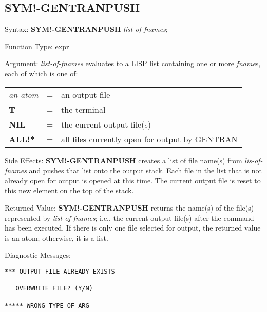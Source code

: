 \subsection{SYM!-GENTRANPUSH}
\begin{describe}{Syntax:}
{\bf SYM!-GENTRANPUSH} {\it  list-of-fnames\/};
\end{describe} 
\begin{describe}{Function Type:}
expr
\end{describe} 
\begin{describe}{Argument:}
{\it list-of-fnames\/} evaluates to a LISP list containing one or more 
{\it fname}s, each of which is one of:

\begin{tabular}{lll}
{\it an atom} & = &  an output file\\
{\bf T} & = & the terminal\\
{\bf NIL} & = & the current output file(s)\\
{\bf ALL!*} & = & all files currently open for output by GENTRAN\\
\end{tabular}
\end{describe} 
\begin{describe}{Side Effects:}
{\bf SYM!-GENTRANPUSH} creates a list of file name(s) from {\it lis-of-fnames\/}
and pushes that list onto the output stack.  Each file in the list that
is not already open for output is opened at this time.  The current
output file is reset to this new element on the top of the stack.
\end{describe} 
\begin{describe}{Returned Value:}
{\bf SYM!-GENTRANPUSH} returns the name(s) of the file(s) represented by 
{\it list-of-fnames\/}; i.e., the current output
file(s) after the command has been executed.  If there is
only one file selected for output, the returned value is an
atom; otherwise, it is a list.
\end{describe} 
\begin{describe}{Diagnostic Messages:}
\begin{verbatim}
*** OUTPUT FILE ALREADY EXISTS

   OVERWRITE FILE? (Y/N)

***** WRONG TYPE OF ARG
\end{verbatim}
\end{describe} 

